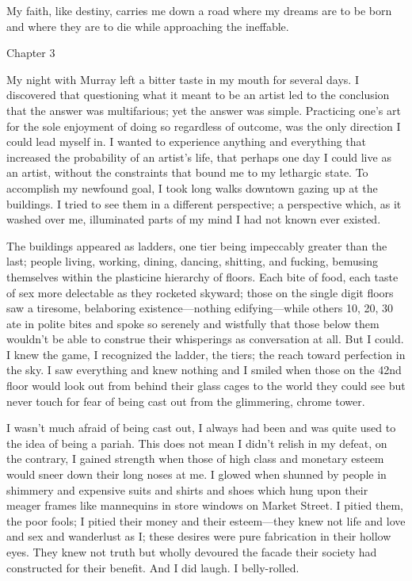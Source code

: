 My faith, like destiny, carries me down a road where my dreams are to be
born and where they are to die while approaching the ineffable.

Chapter 3

My night with Murray left a bitter taste in my mouth for several days. I
discovered that questioning what it meant to be an artist led to the
conclusion that the answer was multifarious; yet the answer was simple.
Practicing one's art for the sole enjoyment of doing so regardless of
outcome, was the only direction I could lead myself in. I wanted to
experience anything and everything that increased the probability of an
artist's life, that perhaps one day I could live as an artist, without
the constraints that bound me to my lethargic state. To accomplish my
newfound goal, I took long walks downtown gazing up at the buildings. I
tried to see them in a different perspective; a perspective which, as it
washed over me, illuminated parts of my mind I had not known ever
existed.

The buildings appeared as ladders, one tier being impeccably greater
than the last; people living, working, dining, dancing, shitting, and
fucking, bemusing themselves within the plasticine hierarchy of floors.
Each bite of food, each taste of sex more delectable as they rocketed
skyward; those on the single digit floors saw a tiresome, belaboring
existence---nothing edifying---while others 10, 20, 30 ate in polite
bites and spoke so serenely and wistfully that those below them wouldn't
be able to construe their whisperings as conversation at all. But I
could. I knew the game, I recognized the ladder, the tiers; the reach
toward perfection in the sky. I saw everything and knew nothing and I
smiled when those on the 42nd floor would look out from behind their
glass cages to the world they could see but never touch for fear of
being cast out from the glimmering, chrome tower.

I wasn't much afraid of being cast out, I always had been and was quite
used to the idea of being a pariah. This does not mean I didn't relish
in my defeat, on the contrary, I gained strength when those of high
class and monetary esteem would sneer down their long noses at me. I
glowed when shunned by people in shimmery and expensive suits and shirts
and shoes which hung upon their meager frames like mannequins in store
windows on Market Street. I pitied them, the poor fools; I pitied their
money and their esteem---they knew not life and love and sex and
wanderlust as I; these desires were pure fabrication in their hollow
eyes. They knew not truth but wholly devoured the facade their society
had constructed for their benefit. And I did laugh. I belly-rolled.


